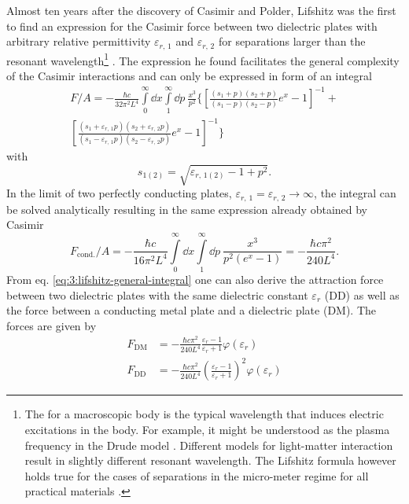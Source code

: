 Almost ten years after the discovery of Casimir and Polder, Lifshitz was the first to find an expression for the Casimir force between two dielectric plates with arbitrary relative permittivity $\varepsilon_{r,\,1}$ and $\varepsilon_{r,\,2}$ for separations larger than the resonant wavelength\footnote{The  for a macroscopic body is the typical wavelength that induces electric excitations in the body.  For example,  it might be understood as the plasma frequency in the Drude model \cite{Ford_1998}. Different models for light-matter interaction result in slightly different resonant wavelength. The Lifshitz formula however holds true for the cases of separations in the micro-meter regime for all practical materials \cite{Kamp_2020}.} \cite{Lifshitz_1956}.
The expression he found facilitates the general complexity of the Casimir interactions and can only be expressed in form of an integral \cite{Lifshitz_1956}
\begin{multline}\label{eq:3:lifshitz-general-integral}
  F/A = -\frac{\hbar c}{32 \pi^2 L^4} \int\limits_0^\infty \dd x \int\limits_1^\infty \dd p \ \frac{x^3}{p^2}\biggl\{ \left[ \frac{(s_1+p)(s_2+p)}{(s_1-p)(s_2-p)} e^x - 1 \right]^{-1} + \\
  \left[ \frac{(s_1+ \varepsilon_{r,\,1} p)(s_2 + \varepsilon_{r,\,2} p)}{(s_1 - \varepsilon_{r,\,1} p)(s_2 - \varepsilon_{r,\,2} p)} e^x - 1 \right]^{-1} \biggr\}
\end{multline}
with
\begin{equation*}
  s_{1(2)} = \sqrt{\varepsilon_{r,\,1(2)} - 1 + p^2} .
\end{equation*}
In the limit of two perfectly conducting plates, $\varepsilon_{r,\,1} = \varepsilon_{r,\,2} \rightarrow \infty$, the integral can be solved analytically resulting in the same expression already obtained by Casimir
\begin{equation}
  F_\mathrm{cond.}/A = -\frac{\hbar c}{16 \pi^2 L^4} \int\limits_0^\infty \dd x \int\limits_1^\infty \dd p \ \frac{x^3}{p^2 (e^x - 1)} = -\frac{\hbar c \pi^2}{240 L^4} .
\end{equation}
From eq. \eqref{eq:3:lifshitz-general-integral} one can also derive the attraction force between two dielectric plates with the same dielectric constant $\varepsilon_r$ (DD) as well as the force between a conducting metal plate and a dielectric plate (DM). The forces are given by
\begin{align} \label{eq:3:casimir-pp-F-DM-lifshitz}
  F_\mathrm{DM} &= -\frac{\hbar c \pi^2}{240 L^4} \frac{\varepsilon_r - 1}{\varepsilon_r + 1} \varphi(\varepsilon_r) \\
  F_\mathrm{DD} &= -\frac{\hbar c \pi^2}{240 L^4} \left( \frac{\varepsilon_r - 1}{\varepsilon_r + 1} \right)^2 \varphi(\varepsilon_r)\label{eq:3:casimir-pp-F-DD-lifshitz}
\end{align}
